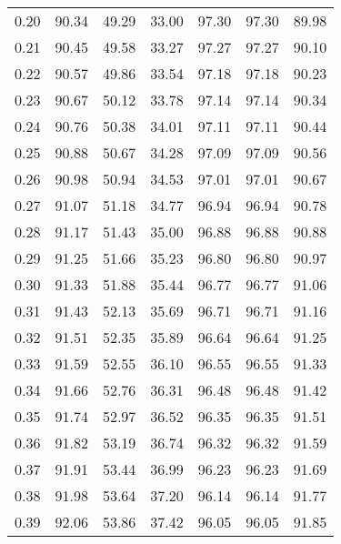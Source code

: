 \begin{tabular}{|c|c|c|c|c|c|c|}
      0.20 &     90.34 &     49.29 &      33.00 &   97.30 &      97.30 &         89.98 \\
      0.21 &     90.45 &     49.58 &      33.27 &   97.27 &      97.27 &         90.10 \\
      0.22 &     90.57 &     49.86 &      33.54 &   97.18 &      97.18 &         90.23 \\
      0.23 &     90.67 &     50.12 &      33.78 &   97.14 &      97.14 &         90.34 \\
      0.24 &     90.76 &     50.38 &      34.01 &   97.11 &      97.11 &         90.44 \\
      0.25 &     90.88 &     50.67 &      34.28 &   97.09 &      97.09 &         90.56 \\
      0.26 &     90.98 &     50.94 &      34.53 &   97.01 &      97.01 &         90.67 \\
      0.27 &     91.07 &     51.18 &      34.77 &   96.94 &      96.94 &         90.78 \\
      0.28 &     91.17 &     51.43 &      35.00 &   96.88 &      96.88 &         90.88 \\
      0.29 &     91.25 &     51.66 &      35.23 &   96.80 &      96.80 &         90.97 \\
      0.30 &     91.33 &     51.88 &      35.44 &   96.77 &      96.77 &         91.06 \\
      0.31 &     91.43 &     52.13 &      35.69 &   96.71 &      96.71 &         91.16 \\
      0.32 &     91.51 &     52.35 &      35.89 &   96.64 &      96.64 &         91.25 \\
      0.33 &     91.59 &     52.55 &      36.10 &   96.55 &      96.55 &         91.33 \\
      0.34 &     91.66 &     52.76 &      36.31 &   96.48 &      96.48 &         91.42 \\
      0.35 &     91.74 &     52.97 &      36.52 &   96.35 &      96.35 &         91.51 \\
      0.36 &     91.82 &     53.19 &      36.74 &   96.32 &      96.32 &         91.59 \\
      0.37 &     91.91 &     53.44 &      36.99 &   96.23 &      96.23 &         91.69 \\
      0.38 &     91.98 &     53.64 &      37.20 &   96.14 &      96.14 &         91.77 \\
      0.39 &     92.06 &     53.86 &      37.42 &   96.05 &      96.05 &         91.85 \\

\end{tabular}
